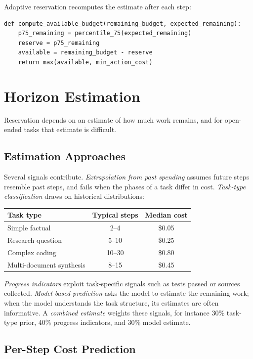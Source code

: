 \documentclass[11pt]{book}
\begin{document}
Adaptive reservation recomputes the estimate after each step:
{\footnotesize
\begin{verbatim}
def compute_available_budget(remaining_budget, expected_remaining):
    p75_remaining = percentile_75(expected_remaining)
    reserve = p75_remaining
    available = remaining_budget - reserve
    return max(available, min_action_cost)
\end{verbatim}
}

\section{Horizon Estimation}

Reservation depends on an estimate of how much work remains, and for open-ended tasks that estimate is difficult.

\subsection{Estimation Approaches}

Several signals contribute. \textit{Extrapolation from past spending} assumes future steps resemble past steps, and fails when the phases of a task differ in cost. \textit{Task-type classification} draws on historical distributions:

\begin{center}
\begin{tabular}{lcc}
\toprule
Task type & Typical steps & Median cost \\
\midrule
Simple factual & 2--4 & \$0.05 \\
Research question & 5--10 & \$0.25 \\
Complex coding & 10--30 & \$0.80 \\
Multi-document synthesis & 8--15 & \$0.45 \\
\bottomrule
\end{tabular}
\end{center}

\textit{Progress indicators} exploit task-specific signals such as tests passed or sources collected. \textit{Model-based prediction} asks the model to estimate the remaining work; when the model understands the task structure, its estimates are often informative. A \textit{combined estimate} weights these signals, for instance 30\% task-type prior, 40\% progress indicators, and 30\% model estimate.

\subsection{Per-Step Cost Prediction}
\end{document}
